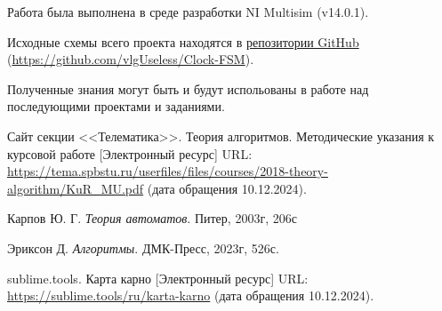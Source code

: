 \documentclass[a4paper, final]{article}
\begin{document}
Работа была выполнена в среде разработки NI Multisim (v14.0.1).

Исходные схемы всего проекта находятся в \href{https://github.com/vlgUseless/Clock-FSM}
{репозитории GitHub} (\url{https://github.com/vlgUseless/Clock-FSM}).

Полученные знания могут быть и будут испольованы в работе над последующими проектами и заданиями.

\cleardoublepage
{}
\newpage
\begin{thebibliography}{0}
	Сайт секции <<Телематика>>. Теория алгоритмов. Методические указания к курсовой работе [Электронный ресурс] URL: \url{https://tema.spbstu.ru/userfiles/files/courses/2018-theory-algorithm/KuR_MU.pdf} (дата обращения 10.12.2024).

  Карпов Ю. Г. \textit{Теория автоматов}. Питер, 2003г, 206с

  Эриксон Д. \textit{Алгоритмы}. ДМК-Пресс, 2023г, 526с.

	sublime.tools. Карта карно [Электронный ресурс] URL: \url{https://sublime.tools/ru/karta-karno} (дата обращения 10.12.2024).
\end{thebibliography}
\end{document}
